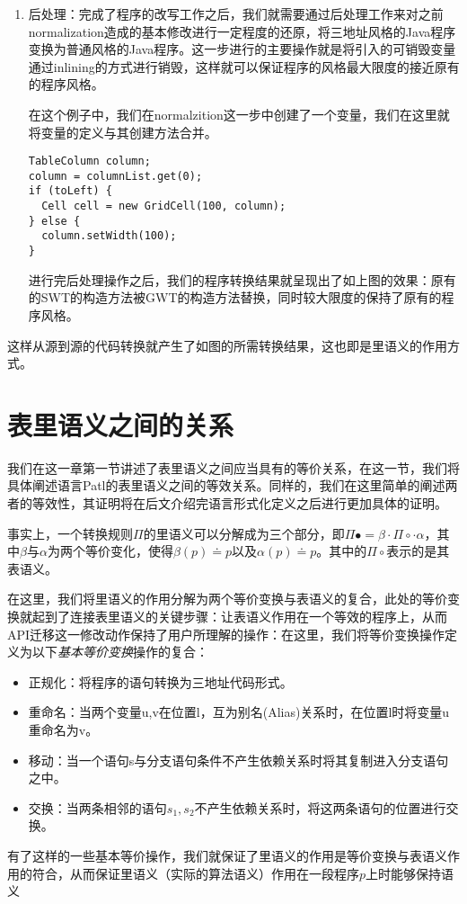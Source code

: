 \begin{enumerate}
\item 后处理：完成了程序的改写工作之后，我们就需要通过后处理工作来对之前normalization造成的基本修改进行一定程度的还原，将三地址风格的Java程序变换为普通风格的Java程序。这一步进行的主要操作就是将引入的可销毁变量通过inlining的方式进行销毁，这样就可以保证程序的风格最大限度的接近原有的程序风格。

在这个例子中，我们在normalzition这一步中创建了一个变量，我们在这里就将变量的定义与其创建方法合并。

\begin{center}
\begin{smpage}{0.6\columnwidth}
\begin{lstlisting}[style=java]
TableColumn column;
column = columnList.get(0);
if (toLeft) {
  Cell cell = new GridCell(100, column);
} else {
  column.setWidth(100);
}
\end{lstlisting}
\end{smpage}
\end{center}

进行完后处理操作之后，我们的程序转换结果就呈现出了如上图的效果：原有的SWT的构造方法被GWT的构造方法替换，同时较大限度的保持了原有的程序风格。
\end{enumerate}

这样从源到源的代码转换就产生了如图的所需转换结果，这也即是里语义的作用方式。

\section{表里语义之间的关系}
我们在这一章第一节讲述了表里语义之间应当具有的等价关系，在这一节，我们将具体阐述语言Patl的表里语义之间的等效关系。同样的，我们在这里简单的阐述两者的等效性，其证明将在后文介绍完语言形式化定义之后进行更加具体的证明。

事实上，一个转换规则$\Pi$的里语义可以分解成为三个部分，即$\Pi\bullet=\beta\cdot\Pi\circ\cdot\alpha$，其中$\beta$与$\alpha$为两个等价变化，使得$\beta(p)\doteq p$以及$\alpha(p)\doteq p$。其中的$\Pi\circ$表示的是其表语义。

在这里，我们将里语义的作用分解为两个等价变换与表语义的复合，此处的等价变换就起到了连接表里语义的关键步骤：让表语义作用在一个等效的程序上，从而API迁移这一修改动作保持了用户所理解的操作：在这里，我们将等价变换操作定义为以下\textit{基本等价变换}操作的复合：
\begin{itemize}
\item 正规化：将程序的语句转换为三地址代码形式。
\item 重命名：当两个变量u,v在位置l，互为别名(Alias)关系时，在位置l时将变量u重命名为v。
\item 移动：当一个语句s与分支语句条件不产生依赖关系时将其复制进入分支语句之中。
\item 交换：当两条相邻的语句$s_1,s_2$不产生依赖关系时，将这两条语句的位置进行交换。
\end{itemize}

有了这样的一些基本等价操作，我们就保证了里语义的作用是等价变换与表语义作用的符合，从而保证里语义（实际的算法语义）作用在一段程序$p$上时能够保持语义